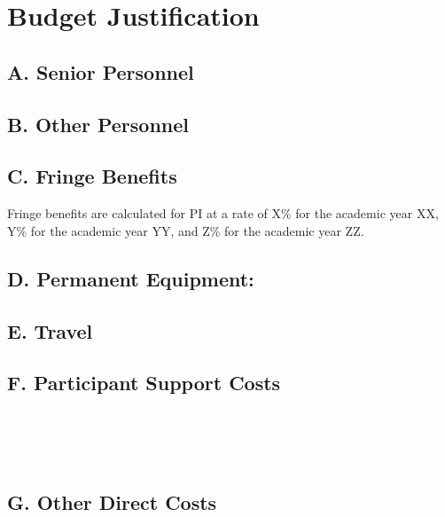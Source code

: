 \section{Budget Justification}
\subsection{A. Senior Personnel}
\subsection{B. Other Personnel}
\subsection{C. Fringe Benefits}
Fringe benefits are calculated for PI at a rate of X\% for the academic year XX, Y\% for the academic year YY, and Z\% for the academic year ZZ.


\subsection{D. Permanent Equipment:}

\subsection{E. Travel}

\subsection{F. Participant Support Costs}
  \\
  \\
  \\

\subsection{G. Other Direct Costs}
  \\
 \\
  \\
  \\
  \\
  \\

